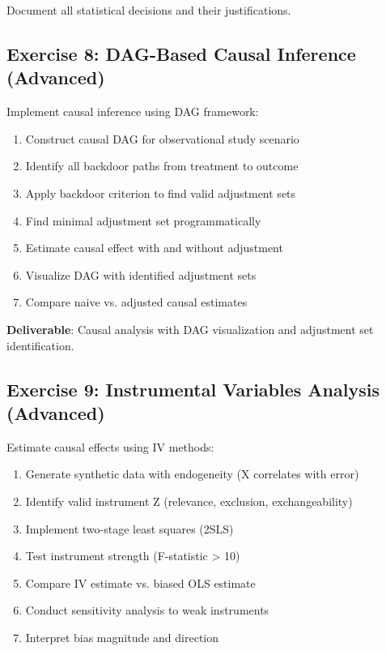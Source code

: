 Document all statistical decisions and their justifications.

\subsection{Exercise 8: DAG-Based Causal Inference (Advanced)}

Implement causal inference using DAG framework:

\begin{enumerate}
    \item Construct causal DAG for observational study scenario
    \item Identify all backdoor paths from treatment to outcome
    \item Apply backdoor criterion to find valid adjustment sets
    \item Find minimal adjustment set programmatically
    \item Estimate causal effect with and without adjustment
    \item Visualize DAG with identified adjustment sets
    \item Compare naive vs. adjusted causal estimates
\end{enumerate}

\textbf{Deliverable}: Causal analysis with DAG visualization and adjustment set identification.

\subsection{Exercise 9: Instrumental Variables Analysis (Advanced)}

Estimate causal effects using IV methods:

\begin{enumerate}
    \item Generate synthetic data with endogeneity (X correlates with error)
    \item Identify valid instrument Z (relevance, exclusion, exchangeability)
    \item Implement two-stage least squares (2SLS)
    \item Test instrument strength (F-statistic > 10)
    \item Compare IV estimate vs. biased OLS estimate
    \item Conduct sensitivity analysis to weak instruments
    \item Interpret bias magnitude and direction
\end{enumerate}

